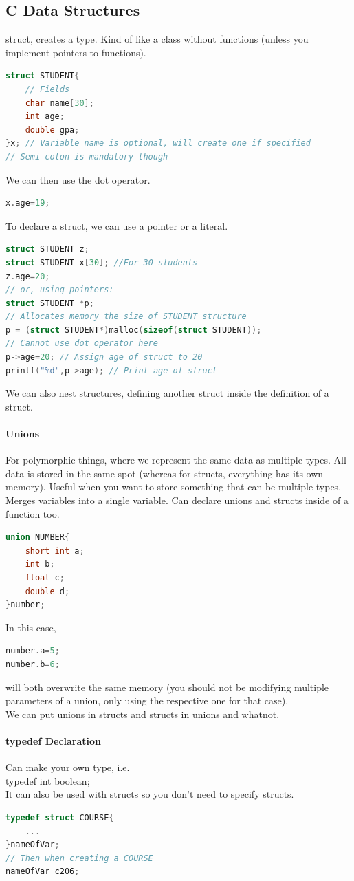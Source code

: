 \documentclass[12 pt]{article}
\begin{document}
\subsection{C Data Structures}
struct, creates a type. Kind of like a class without functions (unless you implement pointers to functions).
\begin{lstlisting}[language=c]
struct STUDENT{
    // Fields
    char name[30];
    int age;
    double gpa;
}x; // Variable name is optional, will create one if specified
// Semi-colon is mandatory though
\end{lstlisting}
We can then use the dot operator.
\begin{lstlisting}[language=c]
x.age=19;
\end{lstlisting}
To declare a struct, we can use a pointer or a literal.
\begin{lstlisting}[language=c]
struct STUDENT z; 
struct STUDENT x[30]; //For 30 students
z.age=20;
// or, using pointers:
struct STUDENT *p;
// Allocates memory the size of STUDENT structure
p = (struct STUDENT*)malloc(sizeof(struct STUDENT));
// Cannot use dot operator here
p->age=20; // Assign age of struct to 20
printf("%d",p->age); // Print age of struct
\end{lstlisting}
We can also nest structures, defining another struct inside the definition of a struct.
\paragraph{Unions}
For polymorphic things, where we represent the same data as multiple types. All data is stored in the same spot (whereas for structs, everything has its own memory). Useful when you want to store something that can be multiple types. Merges variables into a single variable. Can declare unions and structs inside of a function too.
\begin{lstlisting}[language=c]
union NUMBER{
    short int a;
    int b;
    float c;
    double d;
}number;
\end{lstlisting}
In this case,
\begin{lstlisting}[language=c]
number.a=5;
number.b=6;
\end{lstlisting}
will both overwrite the same memory (you should not be modifying multiple parameters of a union, only using the respective one for that case).
\\ We can put unions in structs and structs in unions and whatnot.
\paragraph{typedef Declaration} Can make your own type, i.e.
\\ typedef int boolean;
\\ It can also be used with structs so you don't need to specify structs.
\begin{lstlisting}[language=c]
typedef struct COURSE{
    ...
}nameOfVar;
// Then when creating a COURSE
nameOfVar c206; 
\end{lstlisting}
\end{document}
